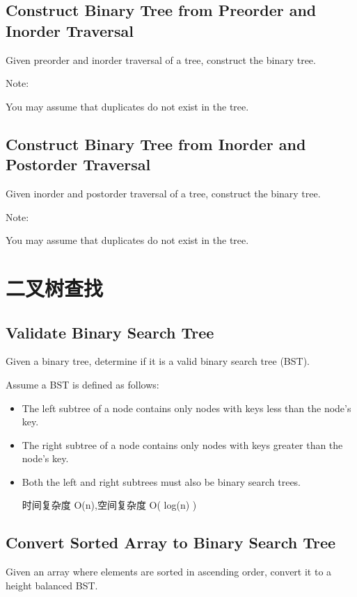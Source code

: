 \documentclass[12pt]{book}
\begin{document}
\subsection{Construct Binary Tree from Preorder and Inorder Traversal}
\label{sec-4-2-1}
Given preorder and inorder traversal of a tree, construct the binary tree.

Note:

You may assume that duplicates do not exist in the tree.

\subsection{Construct Binary Tree from Inorder and Postorder Traversal}
\label{sec-4-2-2}
Given inorder and postorder traversal of a tree, construct the binary tree.

Note:

You may assume that duplicates do not exist in the tree.

\section{二叉树查找}
\label{sec-4-3}

\subsection{Validate Binary Search Tree}
\label{sec-4-3-1}
Given a binary tree, determine if it is a valid binary search tree (BST).

Assume a BST is defined as follows:
\begin{itemize}
\item The left subtree of a node contains only nodes with keys less than the node's key.
\item The right subtree of a node contains only nodes with keys greater than the node's key.
\item Both the left and right subtrees must also be binary search trees.

时间复杂度 O(n),空间复杂度 O( log(n) )
\end{itemize}

\subsection{Convert Sorted Array to Binary Search Tree}
\label{sec-4-3-2}
Given an array where elements are sorted in ascending order, convert it to a height balanced BST.
\end{document}
